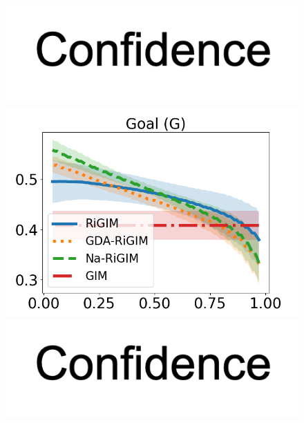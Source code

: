 \documentclass{article}
\begin{document}
\begin{figure}[htbp]
\begin{minipage}{0.16\textwidth}
    \vspace{-0.05in}
    \includegraphics[scale=0.12]{figures/confidence_x_label.png}
    \end{minipage}
    \begin{minipage}{0.16\textwidth}
    \centering
    \includegraphics[scale=0.14]{figures/risk_curve_G_shadow.png}\par
    \vspace{-0.05in}
    \includegraphics[scale=0.12]{figures/confidence_x_label.png}
    \end{minipage}
    \begin{minipage}{0.16\textwidth}
    \centering

\end{minipage}
\end{figure}
\end{document}
